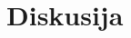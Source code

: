 \documentclass{article}
\begin{document}





\section{Diskusija}
\label{sec:discussion}

\end{document}
